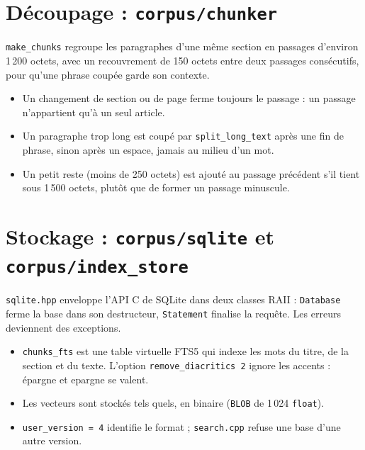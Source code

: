 \documentclass[11pt,a4paper]{article}
\newcommand{\fichier}[1]{\texttt{#1}}
\begin{document}
\section{Découpage : \texttt{corpus/chunker}}

\texttt{make\_chunks} regroupe les paragraphes d'une même section en passages d'environ 1\,200 octets, avec un recouvrement de 150 octets entre deux passages consécutifs, pour qu'une phrase coupée garde son contexte.



\begin{itemize}
  \item Un changement de section ou de page ferme toujours le passage : un passage n'appartient qu'à un seul article.
  \item Un paragraphe trop long est coupé par \texttt{split\_long\_text} après une fin de phrase, sinon après un espace, jamais au milieu d'un mot.
  \item Un petit reste (moins de 250 octets) est ajouté au passage précédent s'il tient sous 1\,500 octets, plutôt que de former un passage minuscule.
\end{itemize}

\section{Stockage : \texttt{corpus/sqlite} et \texttt{corpus/index\_store}}

\fichier{sqlite.hpp} enveloppe l'API C de SQLite dans deux classes RAII : \texttt{Database} ferme la base dans son destructeur, \texttt{Statement} finalise la requête. Les erreurs deviennent des exceptions.



\begin{itemize}
  \item \texttt{chunks\_fts} est une table virtuelle FTS5 qui indexe les mots du titre, de la section et du texte. L'option \texttt{remove\_diacritics 2} ignore les accents : \og épargne \fg{} et \og epargne \fg{} se valent.
  \item Les vecteurs sont stockés tels quels, en binaire (\texttt{BLOB} de 1\,024 \texttt{float}).
  \item \texttt{user\_version = 4} identifie le format ; \texttt{search.cpp} refuse une base d'une autre version.
\end{itemize}
\end{document}
